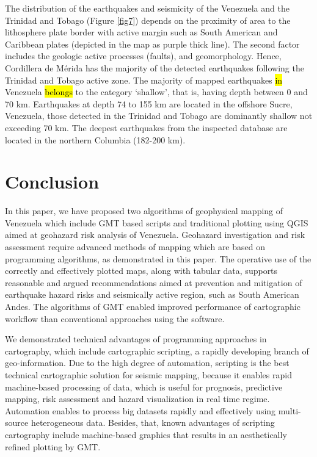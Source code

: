 \documentclass[sustainability,article,submit,pdftex,moreauthors]{Definitions/mdpi}
\begin{document}
The distribution of the earthquakes and seismicity of the Venezuela and the Trinidad and Tobago (Figure \ref{fig7}) depends on the proximity of area to the lithosphere plate border with active margin such as South American and Caribbean plates (depicted in the map as purple thick line). The second factor includes the geologic active processes (faults), and geomorphology. Hence, Cordillera de Mérida has the majority of the detected earthquakes following the Trinidad and Tobago active zone. The majority of mapped earthquakes\hl{ in }Venezuela \hl{belongs} to the category ‘shallow’, that is, having depth between 0 and 70 km. Earthquakes at depth 74 to 155 km are located in the offshore Sucre, Venezuela, those detected in the Trinidad and Tobago are dominantly shallow not exceeding 70 km. The deepest earthquakes from the inspected database are located in the northern Columbia (182-200 km).

\section{Conclusion}

In this paper, we have proposed two algorithms of geophysical mapping of Venezuela which include GMT based scripts and traditional plotting using QGIS aimed at geohazard risk analysis of Venezuela. Geohazard investigation and risk assessment require advanced methods of mapping which are based on programming algorithms, as demonstrated in this paper. The operative use of the correctly and effectively plotted maps, along with tabular data, supports reasonable and argued recommendations aimed at prevention and mitigation of earthquake hazard risks and seismically active region, such as South American Andes. The algorithms of GMT enabled improved performance of cartographic workflow than conventional approaches using the software. 

We demonstrated technical advantages of programming approaches in cartography, which include cartographic scripting, a rapidly developing branch of geo-information. Due to the high degree of automation, scripting is the best technical cartographic solution for seismic mapping, because it enables rapid machine-based processing of data, which is useful for prognosis, predictive mapping, risk assessment and hazard visualization in real time regime. Automation enables to process big datasets rapidly and effectively using multi-source heterogeneous data. Besides, that, known advantages of scripting cartography include machine-based graphics that results in an aesthetically refined plotting by GMT. 
\end{document}
